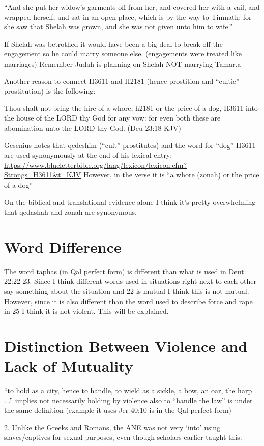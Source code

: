 \documentclass[11pt]{article}
\begin{document}
{“And she put her widow’s garments off from her, and covered her with a vail, and wrapped herself, and sat in an open place, which is by the way to Timnath; for she saw that Shelah was grown, and she was not given unto him to wife.”

If Shelah was betrothed it would have been a big deal to break off the engagement so he could marry someone else. (engagements were treated like marriages) Remember Judah is planning on Shelah NOT marrying Tamar.a

Another reason to connect H3611 and H2181 (hence prostition and “cultic” prostitution) is the following:

Thou shalt not bring the hire of a whore, h2181 or the price of a dog, H3611 into the house of the LORD thy God for any vow: for even both these are abomination unto the LORD thy God. (Deu 23:18 KJV)

Gesenius notes that qedeshim (“cult” prostitutes) and the word for “dog” H3611 are used synonymously at the end of his lexical entry: \url{https://www.blueletterbible.org/lang/lexicon/lexicon.cfm?Strongs=H3611&t=KJV} However, in the verse it is “a whore (zonah) or the price of a dog”

On the biblical and translational evidence alone I think it’s pretty overwhelming that qedashah and zonah are synonymous.


\section{Word Difference}

The word taphas (in Qal perfect form) is different than what is used in Deut 22:22-23. Since I think different words used in situations right next to each other say something about the situation and 22 is mutual I think this is not mutual. However, since it is also different than the word used to describe force and rape in 25 I think it is not violent. This will be explained.

\section{Distinction Between Violence and Lack of Mutuality}
“to hold as a city, hence to handle, to wield as a sickle, a bow, an oar, the harp . . .” implies not necessarily holding by violence also to “handle the law” is under the same definition (example it uses Jer 40:10 is in the Qal perfect form)


2. Unlike the Greeks and Romans, the ANE was not very ‘into’ using slaves/captives for sexual purposes, even though scholars earlier taught this:


}
\end{document}
